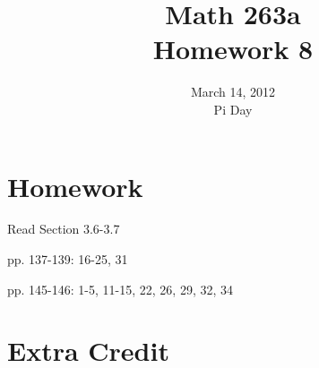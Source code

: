 \documentclass{exam}
\title{Math 263a \\ Homework 8}
\date{March 14, 2012 \\ Pi Day}
\begin{document}
\maketitle

\section{Homework}

\begin{itemize*}
  \item Read Section 3.6-3.7
  \item pp. 137-139: 16-25, 31
  \item pp. 145-146: 1-5, 11-15, 22, 26, 29, 32, 34
\end{itemize*}

\section{Extra Credit}
\end{document}
